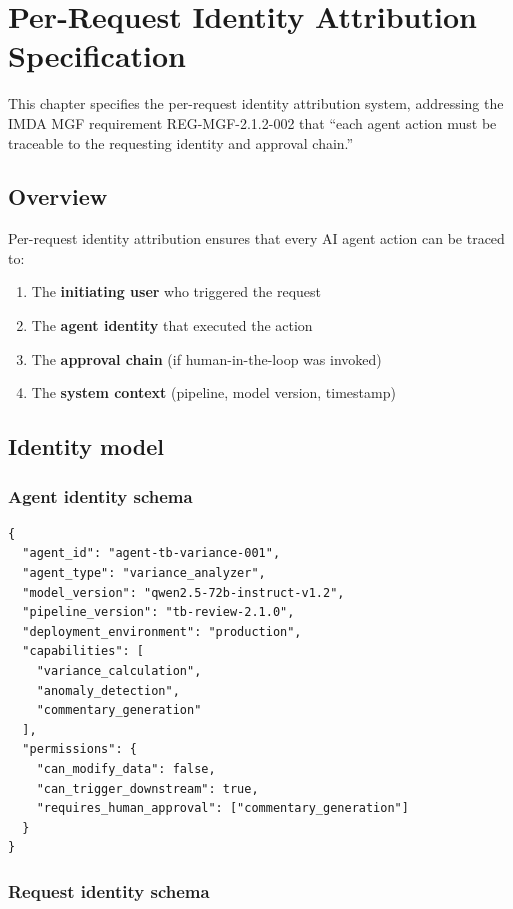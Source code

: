 \chapter{Per-Request Identity Attribution Specification}\label{ch:identity}

This chapter specifies the per-request identity attribution system, addressing
the IMDA MGF requirement REG-MGF-2.1.2-002 that ``each agent action must be
traceable to the requesting identity and approval chain.''

\section{Overview}

Per-request identity attribution ensures that every AI agent action can be
traced to:
\begin{enumerate}
  \item The \textbf{initiating user} who triggered the request
  \item The \textbf{agent identity} that executed the action
  \item The \textbf{approval chain} (if human-in-the-loop was invoked)
  \item The \textbf{system context} (pipeline, model version, timestamp)
\end{enumerate}

\section{Identity model}

\subsection{Agent identity schema}

\begin{lstlisting}[basicstyle=\ttfamily\small,caption={Agent identity record schema.}]
{
  "agent_id": "agent-tb-variance-001",
  "agent_type": "variance_analyzer",
  "model_version": "qwen2.5-72b-instruct-v1.2",
  "pipeline_version": "tb-review-2.1.0",
  "deployment_environment": "production",
  "capabilities": [
    "variance_calculation",
    "anomaly_detection",
    "commentary_generation"
  ],
  "permissions": {
    "can_modify_data": false,
    "can_trigger_downstream": true,
    "requires_human_approval": ["commentary_generation"]
  }
}
\end{lstlisting}

\subsection{Request identity schema}

